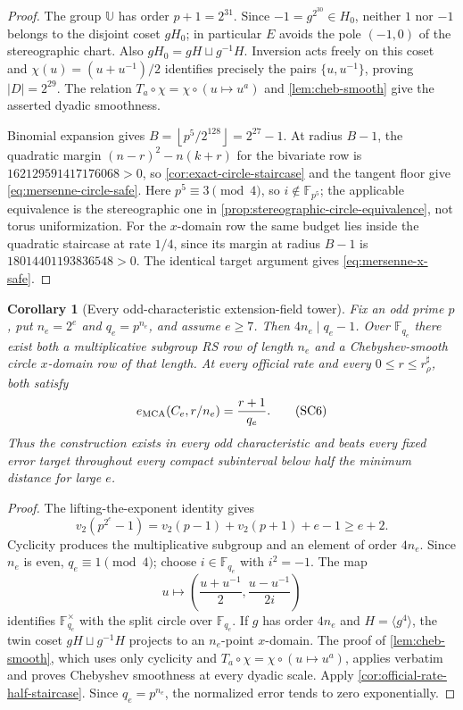 \documentclass[11pt,a4paper]{amsart}
\numberwithin{equation}{section}
\newtheorem{corollary}[corollary]{Corollary}
\theoremstyle{remark}
\newcommand{\F}{\mathbb F}
\newcommand{\UU}{\mathbb U}
\newcommand{\abs}[1]{\lvert #1\rvert}
\newcommand{\floor}[1]{\left\lfloor #1\right\rfloor}
\begin{document}
\begin{proof}
The group \(\UU\) has order \(p+1=2^{31}\).  Since
\(-1=g^{2^{30}}\in H_0\), neither \(1\) nor \(-1\) belongs to the
disjoint coset \(gH_0\); in particular \(E\) avoids the pole
\((-1,0)\) of the stereographic chart.  Also
\(gH_0=gH\sqcup g^{-1}H\).  Inversion acts freely on this coset and
\(\chi(u)=(u+u^{-1})/2\) identifies precisely the pairs
\(\{u,u^{-1}\}\), proving \(\abs D=2^{29}\).  The relation
\(T_a\circ\chi=\chi\circ(u\mapsto u^a)\) and
\cref{lem:cheb-smooth} give the asserted dyadic smoothness.

Binomial expansion gives
\(B=\floor{p^5/2^{128}}=2^{27}-1\).  At radius \(B-1\), the quadratic
margin \((n-r)^2-n(k+r)\) for the bivariate row is
\(162129591417176068>0\), so
\cref{cor:exact-circle-staircase} and the tangent floor give
\eqref{eq:mersenne-circle-safe}.  Here \(p^5\equiv3\pmod4\), so
\(i\notin\F_{p^5}\); the applicable equivalence is the stereographic
one in \cref{prop:stereographic-circle-equivalence}, not torus
uniformization.  For the \(x\)-domain row the same budget lies inside
the quadratic staircase at rate \(1/4\), since its margin at radius
\(B-1\) is \(18014401193836548>0\).  The identical target argument gives
\eqref{eq:mersenne-x-safe}.
\end{proof}

\begin{corollary}[Every odd-characteristic extension-field tower]
\label{cor:density-one-extension-towers}
Fix an odd prime \(p\), put \(n_e=2^e\) and \(q_e=p^{n_e}\), and assume
\(e\ge7\).  Then \(4n_e\mid q_e-1\).  Over \(\F_{q_e}\) there exist
both a multiplicative subgroup RS row of length \(n_e\) and a
Chebyshev-smooth circle \(x\)-domain row of that length.  At every
official rate and every \(0\le r\le r_\rho^\sharp\), both satisfy
\[
 e_{\rm MCA}(C_e,r/n_e)=\frac{r+1}{q_e}.           \tag{SC6}
\]
Thus the construction exists in every odd characteristic and beats every
fixed error target throughout every compact subinterval below half the
minimum distance for large \(e\).
\end{corollary}

\begin{proof}
The lifting-the-exponent identity gives
\[
 v_2(p^{2^e}-1)=v_2(p-1)+v_2(p+1)+e-1\ge e+2.
\]
Cyclicity produces the multiplicative subgroup and an element of order
\(4n_e\).  Since \(n_e\) is even, \(q_e\equiv1\pmod4\); choose
\(i\in\F_{q_e}\) with \(i^2=-1\).  The map
\[
 u\longmapsto
 \left(\frac{u+u^{-1}}2,\frac{u-u^{-1}}{2i}\right)
\]
identifies \(\F_{q_e}^\times\) with the split circle over
\(\F_{q_e}\).  If \(g\) has order \(4n_e\) and
\(H=\langle g^4\rangle\), the twin coset
\(gH\sqcup g^{-1}H\) projects to an \(n_e\)-point \(x\)-domain.
The proof of \cref{lem:cheb-smooth}, which uses only cyclicity and
\(T_a\circ\chi=\chi\circ(u\mapsto u^a)\), applies verbatim and proves
Chebyshev smoothness at every dyadic scale.
Apply \cref{cor:official-rate-half-staircase}.  Since
\(q_e=p^{n_e}\), the normalized error tends to zero exponentially.
\end{proof}
\end{document}
